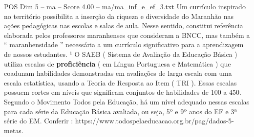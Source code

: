 \begin{textsample}{POS Dim 5 – ma – Score 4.00 – ma/ma\_inf\_e\_ef\_3.txt}
Um currículo inspirado no território possibilita a inserção da riqueza e diversidade do Maranhão nas ações pedagógicas nas escolas e salas de aula.
Nesse sentido, constitui referência elaborada pelos professores maranhenses que consideram a BNCC, mas também a “ maranhensidade ” necessária a um currículo significativo para a aprendizagem de nossos estudantes. ¹ O SAEB ( Sistema de Avaliação da Educação Básica ) utiliza escalas de \textbf{proficiência} ( em Língua Portuguesa e Matemática ) que coadunam habilidades demonstradas em avaliações de larga escala com uma escala estatística, usando a Teoria de Resposta ao Item ( TRI ).
Essas escalas possuem cortes em níveis que significam conjuntos de habilidades de 100 a 450.
Segundo o Movimento Todos pela Educação, há um nível adequado nessas escalas para cada série da Educação Básica avaliada, ou seja, 5º e 9º anos do EF e 3ª série do EM.
Conferir : https://www.todospelaeducacao.org.br/pag/dados-5-metas.

\end{textsample}
